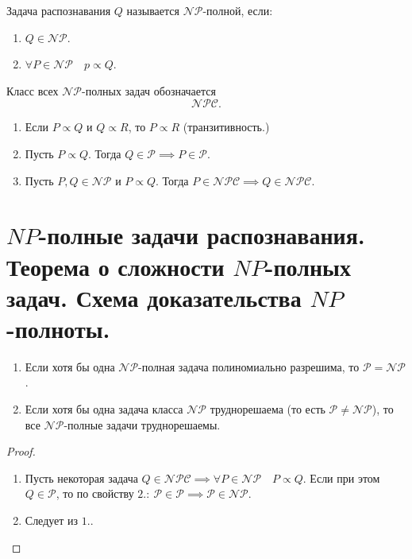 \begin{definition}
    Задача распознавания $ Q $ называется $ \mathcal{NP} $-полной, если:
    \begin{enumerate}
        \item $ Q \in \mathcal{NP} $.
        \item $ \forall P \in \mathcal{NP} \quad p \propto Q $.
    \end{enumerate}

    Класс всех $ \mathcal{NP} $-полных задач обозначается
    \[
        \mathcal{NPC}.
    \]
\end{definition}

\begin{theorem}\leavevmode
    \begin{enumerate}
        \item Если $ P \propto Q $ и $ Q \propto R $, то $ P \propto R $ (транзитивность.)
        \item Пусть $ P \propto Q $. Тогда $ Q \in \mathcal{P} \implies P \in \mathcal{P} $.
        \item Пусть $ P,Q \in \mathcal{NP} $ и $ P \propto Q $. Тогда $ P \in \mathcal{NPC} \implies Q \in \mathcal{NPC} $.
    \end{enumerate}
\end{theorem}

\section{$NP$-полные задачи распознавания. Теорема о сложности $NP$-полных задач. Схема доказательства $NP$-полноты.}

\begin{theorem}\leavevmode
    \begin{enumerate}
        \item Если хотя бы одна $ \mathcal{NP} $-полная задача полиномиально разрешима, то $ \mathcal{P} = \mathcal{NP} $.
        \item Если хотя бы одна задача класса $ \mathcal{NP} $ труднорешаема (то есть $ \mathcal{P} \ne \mathcal{NP} $), то все $ \mathcal{NP} $-полные задачи труднорешаемы.
    \end{enumerate}
\end{theorem}

\begin{proof}\leavevmode
    \begin{enumerate}
        \item Пусть некоторая задача $ Q \in \mathcal{NPC} \implies \forall P \in \mathcal{NP} \quad P \propto Q $.
              Если при этом $ Q \in \mathcal{P} $, то по свойству $ 2.: \ \mathcal{P} \in \mathcal{P} \implies \mathcal{P} \in \mathcal{NP} $.

        \item Следует из $ 1. $.
    \end{enumerate}
\end{proof}

